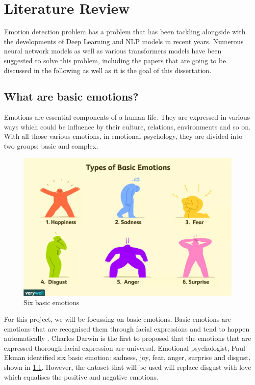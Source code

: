 
\chapter{Literature Review}

Emotion detection problem has a problem that has been tackling alongside with the developments of Deep Learning and NLP models in recent years. 
Numerous neural network models as well as various transformers models have been suggested to solve this problem, including the papers that are going to be discussed in the following as well as it is the goal of this dissertation.

\section{What are basic emotions?}
Emotions are essential components of a human life. They are expressed in various ways which could be influence by their culture, relations, environments and so on. With all those various emotions, in emotional psychology, they are divided into two groups: basic and complex.

\begin{figure}[ht]
    \centerline{\includegraphics[scale=0.72]{Figures/six_emotions.png}}
    \caption{Six basic emotions}
    \label{fig:emotions}
 \end{figure}

For this project, we will be focussing on basic emotions. Basic emotions are emotions that are recognised them through facial expressions and tend to happen automatically \cite{Uwa_2023}. Charles Darwin is the first to proposed that the emotions that are expressed thorough facial expression are universal. Emotional psychologist, Paul Ekman identified six basic emotion: sadness, joy, fear, anger, surprise and disgust, shown in \ref{fig:emotions}. However, the dataset that will be used will replace disgust with love which equalises the positive and negative emotions.

